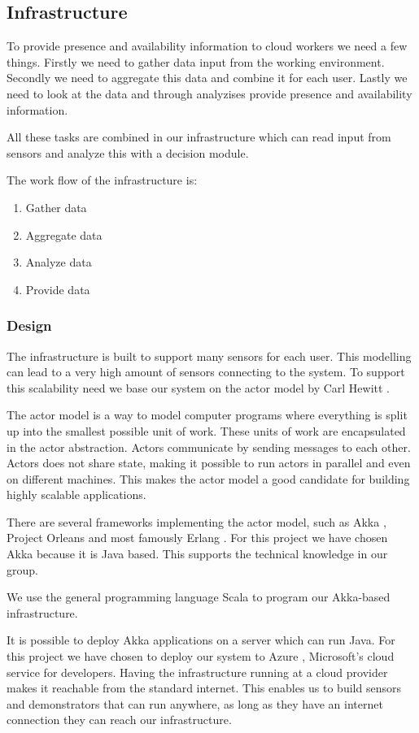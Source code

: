 \documentclass{sigchi}
\begin{document}
\subsection{Infrastructure}
To provide presence and availability information to cloud workers we need a few things.
Firstly we need to gather data input from the working environment.
Secondly we need to aggregate this data and combine it for each user.
Lastly we need to look at the data and through analyzises provide presence and availability information.

All these tasks are combined in our infrastructure which can read input from sensors and analyze this with a decision module.

The work flow of the infrastructure is:
\begin{enumerate}
  \item Gather data
  \item Aggregate data
  \item Analyze data
  \item Provide data
\end{enumerate}

\subsubsection{Design}
The infrastructure is built to support many sensors for each user.
This modelling can lead to a very high amount of sensors connecting to the system.
To support this scalability need we base our system on the actor model by Carl Hewitt \cite{hewitt1973universal}.

The actor model is a way to model computer programs where everything is split up into the smallest possible unit of work.
These units of work are encapsulated in the actor abstraction.
Actors communicate by sending messages to each other.
Actors does not share state, making it possible to run actors in parallel and even on different machines.
This makes the actor model a good candidate for building highly scalable applications.

There are several frameworks implementing the actor model, such as Akka \cite{akka}, Project Orleans \cite{orleans} and most famously Erlang \cite{erlang}.
For this project we have chosen Akka because it is Java based.
This supports the technical knowledge in our group.

We use the general programming language Scala \cite{scala} to program our Akka-based infrastructure.

It is possible to deploy Akka applications on a server which can run Java.
For this project we have chosen to deploy our system to Azure \cite{azure}, Microsoft's cloud service for developers.
Having the infrastructure running at a cloud provider makes it reachable from the standard internet.
This enables us to build sensors and demonstrators that can run anywhere, as long as they have an internet connection they can reach our infrastructure.
\end{document}
